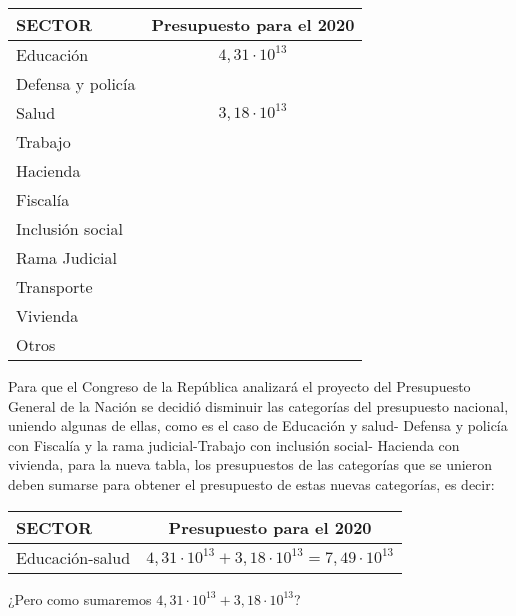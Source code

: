 \documentclass[12pt,a4paper]{article}
\begin{document}
\begin{center}
\begin{tabular}{|l|c|}
\hline
\cellcolor{fondoazul}\textbf{SECTOR} & \textbf{Presupuesto para el 2020} \\
\hline
Educación & $4,31 \cdot 10^{13}$ \\
\hline
Defensa y policía & \\
\hline
Salud & $3,18 \cdot 10^{13}$ \\
\hline
Trabajo & \\
\hline
Hacienda & \\
\hline
Fiscalía & \\
\hline
Inclusión social & \\
\hline
Rama Judicial & \\
\hline
Transporte & \\
\hline
Vivienda & \\
\hline
Otros & \\
\hline
\end{tabular}
\end{center}


Para que el Congreso de la República analizará el proyecto del Presupuesto General de la Nación se decidió disminuir las categorías del presupuesto nacional, uniendo algunas de ellas, como es el caso de Educación y salud- Defensa y policía con Fiscalía y la rama judicial-Trabajo con inclusión social- Hacienda con vivienda, para la nueva tabla, los presupuestos de las categorías que se unieron deben sumarse para obtener el presupuesto de estas nuevas categorías, es decir:

\vspace{0.5cm}

\begin{center}
\begin{tabular}{|l|c|}
\hline
\cellcolor{fondoazul}\textbf{SECTOR} & \textbf{Presupuesto para el 2020} \\
\hline
Educación-salud & $4,31 \cdot 10^{13} + 3,18 \cdot 10^{13} = 7,49 \cdot 10^{13}$ \\
\hline
\end{tabular}
\end{center}

\vspace{0.5cm}

¿Pero como sumaremos $4,31 \cdot 10^{13} + 3,18 \cdot 10^{13}$?

\vspace{0.5cm}
\end{document}
